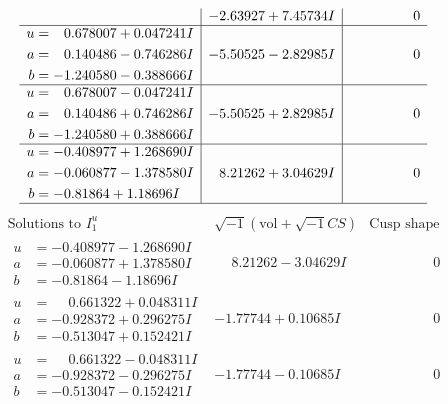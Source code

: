 \documentclass[1p]{elsarticle_modified}
\theoremstyle{definition}
\newcommand{\I}{\sqrt{-1}}
\begin{document}
$$\begin{array}{c|c|c}
 & -2.63927 + 7.45734 I & \phantom{-0.000000 } 0 \\ \hline\begin{aligned}
u &= \phantom{-}0.678007 + 0.047241 I \\
a &= \phantom{-}0.140486 - 0.746286 I \\
b &= -1.240580 - 0.388666 I\end{aligned}
 & -5.50525 - 2.82985 I & \phantom{-0.000000 } 0 \\ \hline\begin{aligned}
u &= \phantom{-}0.678007 - 0.047241 I \\
a &= \phantom{-}0.140486 + 0.746286 I \\
b &= -1.240580 + 0.388666 I\end{aligned}
 & -5.50525 + 2.82985 I & \phantom{-0.000000 } 0 \\ \hline\begin{aligned}
u &= -0.408977 + 1.268690 I \\
a &= -0.060877 - 1.378580 I \\
b &= -0.81864 + 1.18696 I\end{aligned}
 & \phantom{-}8.21262 + 3.04629 I & \phantom{-0.000000 } 0\\
 \hline 
 \end{array}$$\newpage$$\begin{array}{c|c|c}  
\text{Solutions to }I^u_{1}& \I (\text{vol} + \sqrt{-1}CS) & \text{Cusp shape}\\
 \hline 
\begin{aligned}
u &= -0.408977 - 1.268690 I \\
a &= -0.060877 + 1.378580 I \\
b &= -0.81864 - 1.18696 I\end{aligned}
 & \phantom{-}8.21262 - 3.04629 I & \phantom{-0.000000 } 0 \\ \hline\begin{aligned}
u &= \phantom{-}0.661322 + 0.048311 I \\
a &= -0.928372 + 0.296275 I \\
b &= -0.513047 + 0.152421 I\end{aligned}
 & -1.77744 + 0.10685 I & \phantom{-0.000000 } 0 \\ \hline\begin{aligned}
u &= \phantom{-}0.661322 - 0.048311 I \\
a &= -0.928372 - 0.296275 I \\
b &= -0.513047 - 0.152421 I\end{aligned}
 & -1.77744 - 0.10685 I & \phantom{-0.000000 } 0 \\ \hline\begin{aligned}

\end{aligned}
\end{array}$$
\end{document}
